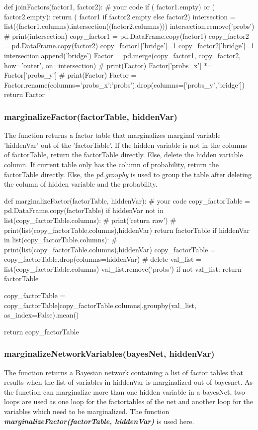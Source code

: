 \documentclass[aps,letterpaper,10pt]{revtex4}
\begin{document}
\begin{python}
def joinFactors(factor1, factor2):
    # your code
    if ( factor1.empty) or ( factor2.empty):
        return ( factor1 if  factor2.empty else factor2)
    intersection = list((factor1.columns).intersection((factor2.columns)))
    intersection.remove('probs')
    # print(intersection)
    copy_factor1 = pd.DataFrame.copy(factor1)
    copy_factor2 = pd.DataFrame.copy(factor2)
    copy_factor1['bridge']=1
    copy_factor2['bridge']=1
    intersection.append('bridge')
    Factor = pd.merge(copy_factor1, copy_factor2, how='outer', on=intersection)
    # print(Factor)
    Factor['probs_x'] *= Factor['probs_y']
    # print(Factor)
    Factor = Factor.rename(columns={'probs_x':'probs'}).drop(columns=['probs_y','bridge'])
    return Factor
\end{python}

\subsubsection{marginalizeFactor(factorTable, hiddenVar)}
The function returns a factor table that marginalizes marginal variable 'hiddenVar' out of the 'factorTable'.
If the hidden variable is not in the columns of factorTable, return the factorTable directly. Else, delete the hidden variable column. If current table only has the column of probability, return the factorTable directly. Else, the \emph{pd.groupby} is used to group the table after deleting the column of hidden variable and the probability. 


\begin{python}
def marginalizeFactor(factorTable, hiddenVar):
    # your code 
    copy_factorTable = pd.DataFrame.copy(factorTable)
    if  hiddenVar not in list(copy_factorTable.columns):
        # print('return raw')
        # print(list(copy_factorTable.columns),hiddenVar)
        return factorTable
    if hiddenVar in list(copy_factorTable.columns):
        # print(list(copy_factorTable.columns),hiddenVar)
        copy_factorTable = copy_factorTable.drop(columns=hiddenVar) # delete
        val_list = list(copy_factorTable.columns)
        val_list.remove('probs')
        if not val_list:
            return factorTable

        copy_factorTable = copy_factorTable[copy_factorTable.columns].groupby(val_list, as_index=False).mean()

        return copy_factorTable
\end{python}

\subsubsection{marginalizeNetworkVariables(bayesNet, hiddenVar)}
The function returns a Bayesian network containing a list of factor tables that results when the list of variables in hiddenVar is marginalized out of bayesnet.
As the function can marginalize more than one hidden variable in a bayesNet, two loops are used as one loop for the factortables of the net and another loop for the variables which need to be marginalized. The function \emph{\textbf{marginalizeFactor(factorTable, hiddenVar)}} is used here. 
\end{document}
